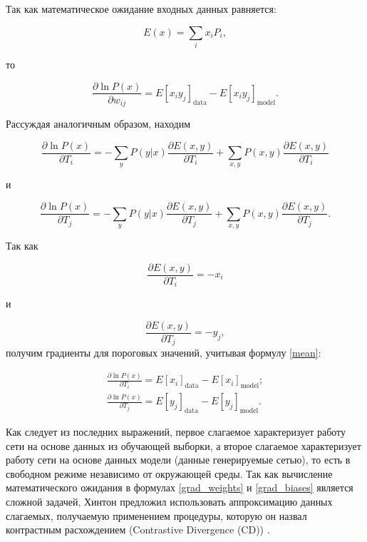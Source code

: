 Так как математическое ожидание входных данных равняется:
	
\begin{equation}
		\label{mean}
		E(x)=\sum_i x_iP_i,
\end{equation}	  
	
то
	
\begin{equation}
    \label{grad_weights}
	\frac{\partial \ln P(x)}{\partial w_{ij}}=E\left[x_iy_j\right]_{\text{data}}-E\left[x_iy_j\right]_{\text{model}}.
\end{equation}
	
Рассуждая аналогичным образом, находим
	
\begin{equation*}
	\frac{\partial \ln P(x)}{\partial T_{i}}=-\sum_y P(y \lvert x)\frac{\partial E(x,y)}{\partial T_{i}} + \sum_{x,y} P(x,y)\frac{\partial E(x,y)}{\partial T_{i}}
\end{equation*}
	
и
	
\begin{equation*}
	\frac{\partial \ln P(x)}{\partial T_{j}}=-\sum_y P(y \lvert x)\frac{\partial E(x,y)}{\partial T_{j}} + \sum_{x,y} P(x,y)\frac{\partial E(x,y)}{\partial T_{j}}.
\end{equation*}
	
Так как
	
\begin{equation*}
	\frac{\partial E(x,y)}{\partial T_{i}}=-x_i 
\end{equation*}
	
и 
	
\begin{equation*}
	\frac{\partial E(x,y)}{\partial T_{j}}=-y_j,
\end{equation*}
получим градиенты для пороговых значений, учитывая формулу \ref{mean}:
	
\begin{equation}
\label{grad_biases}
\begin{aligned}
	\frac{\partial \ln P(x)}{\partial T_i}=E\left[x_i\right]_{\text{data}}-E\left[x_i\right]_{\text{model}};\\
	\frac{\partial \ln P(x)}{\partial T_j}=E\left[y_j\right]_{\text{data}}-E\left[y_j\right]_{\text{model}}.
\end{aligned}
\end{equation}
	
Как следует из последних выражений, первое слагаемое характеризует работу сети на основе данных из обучающей выборки, а  второе слагаемое характеризует работу сети на основе данных модели (данные генерируемые сетью), то есть в свободном режиме независимо от окружающей среды.
Так как вычисление математического ожидания в формулах \ref{grad_weights} и \ref{grad_biases} является сложной задачей, Хинтон предложил использовать аппроксимацию данных слагаемых, получаемую применением процедуры, которую он назвал контрастным расхождением (Contrastive Divergence (CD)) \cite{n1}.
	
